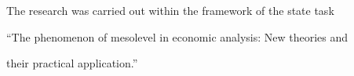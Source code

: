 




\Ack


\noindent


The research was carried out within the framework of the state task 


``The phenomenon of mesolevel in economic analysis: New theories and 


their practical application.''













